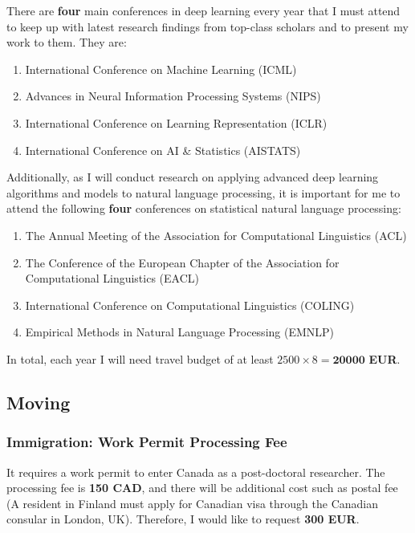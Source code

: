 \documentclass[11pt, oneside]{essay}
\begin{document}
There are \textbf{four} main conferences in deep learning every
year that I must attend to keep up with latest research findings
from top-class scholars and to present my work to them. They are:
\begin{enumerate}
    \item International Conference on Machine Learning (ICML)
    \item Advances in Neural Information Processing Systems (NIPS)
    \item International Conference on Learning Representation (ICLR)
    \item International Conference on AI \& Statistics (AISTATS)
\end{enumerate}

Additionally, as I will conduct research on applying advanced
deep learning algorithms and models to natural language
processing, it is important for me to attend the following
\textbf{four} conferences on statistical natural language processing:
\begin{enumerate}
    \item The Annual Meeting of the Association for Computational Linguistics (ACL)
    \item The Conference of the European Chapter of the
    Association for Computational Linguistics (EACL)
    \item International Conference on Computational Linguistics (COLING)
    \item Empirical Methods in Natural Language Processing (EMNLP)
\end{enumerate}

In total, each year I will need travel budget of at least $2500
\times 8 = \mathbf{20000}$ \textbf{EUR}.


\subsection{Moving}

\subsubsection{Immigration: Work Permit Processing Fee}

It requires a work permit to enter Canada as a post-doctoral
researcher. The processing fee is \textbf{150 CAD}, and
there will be additional cost such as postal fee (A
resident in Finland must apply for Canadian visa through the
Canadian consular in London, UK). Therefore, I would like to
request \textbf{300 EUR}.
\end{document}
